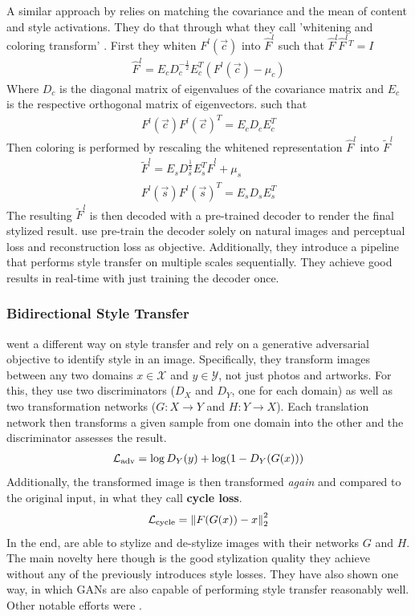 A similar approach by \citeauthor*{WCT} relies on matching the covariance and the mean of content and style activations.
They do that through what they call 'whitening and coloring transform' \cite{WCT}.
First they whiten $F^l(\vec{c})$ into $\hat{F}^l$ such that $\hat{F}^l \hat{F}^l{}^T = I$
\begin{align}
    \hat{F}^l = E_c D_c^{-\frac{1}{2}} E_c^T (F^l(\vec{c}) - \mu_c)
\end{align}
Where $D_c$ is the diagonal matrix of eigenvalues of the covariance matrix and $E_c$ is the respective orthogonal matrix of eigenvectors.
such that
\begin{align}
    F^l(\vec{c}) F^l(\vec{c})^T = E_c D_c E_c^T
\end{align}
Then coloring is performed by rescaling the whitened representation $\hat{F}^l$ into $\tilde{F}^l$
\begin{align}
    \tilde{F}^l = E_s D_s^{\frac{1}{2}} E_s^T \hat{F}^l + \mu_s \\
    F^l(\vec{s}) F^l(\vec{s})^T = E_s D_s E_s^T
\end{align}
The resulting $\tilde{F}^l$ is then decoded with a pre-trained decoder to render the final stylized result.
\citeauthor*{WCT} use pre-train the decoder solely on natural images and perceptual loss and reconstruction loss as objective.
Additionally, they introduce a pipeline that performs style transfer on multiple scales sequentially.
They achieve good results in real-time with just training the decoder once.

\subsubsection{Bidirectional Style Transfer}
\citeauthor*{CycleGAN} went a different way on style transfer and rely on a generative adversarial objective to identify style in an image.
Specifically, they transform images between any two domains $x \in \mathcal{X}$ and $y \in \mathcal{Y}$, not just photos and artworks.
For this, they use two discriminators ($D_X$ and $D_Y$, one for each domain) as well as two transformation networks ($G: X \rightarrow Y$ and $H: Y \rightarrow X$).
Each translation network then transforms a given sample from one domain into the other and the discriminator assesses the result.
\begin{align}
    \mathcal{L}_{\text{adv}} = \log D_Y(y) + \log(1 - D_Y(G(x)))
\end{align}
Additionally, the transformed image is then transformed \textit{again} and compared to the original input, in what they call \textbf{cycle loss}.
\begin{align}
    \mathcal{L}_{\text{cycle}} = \left\lVert F(G(x)) - x\right\rVert^2_2
\end{align}
In the end, \citeauthor*{CycleGAN} are able to stylize and de-stylize images with their networks $G$ and $H$.
The main novelty here though is the good stylization quality they achieve without any of the previously introduces style losses.
They have also shown one way, in which GANs are also capable of performing style transfer reasonably well.
Other notable efforts were .

